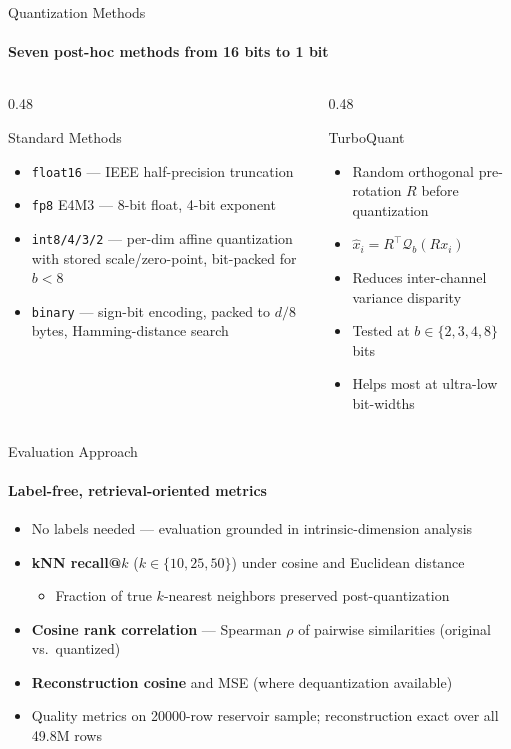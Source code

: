 \documentclass[aspectratio=169,10pt]{beamer}
\begin{document}
\begin{frame}{Quantization Methods}
	\framesubtitle{Seven post-hoc methods from 16 bits to 1 bit}
	\begin{columns}[T]
		\begin{column}{0.48\textwidth}
			\begin{block}{Standard Methods}
				\begin{itemize}
					\item \texttt{float16} --- IEEE half-precision truncation
					\item \texttt{fp8} E4M3 --- 8-bit float, 4-bit exponent
					\item \texttt{int8/4/3/2} --- per-dim affine quantization
					      with stored scale/zero-point, bit-packed for $b < 8$
					\item \texttt{binary} --- sign-bit encoding, packed to
					      $d/8$ bytes, Hamming-distance search
				\end{itemize}
			\end{block}
		\end{column}
		\begin{column}{0.48\textwidth}
			\begin{block}{TurboQuant}
				\begin{itemize}
					\item Random orthogonal pre-rotation $R$ before quantization
					\item $\hat{x}_i = R^\top \mathcal{Q}_b(R x_i)$
					\item Reduces inter-channel variance disparity
					\item Tested at $b \in \{2, 3, 4, 8\}$ bits
					\item Helps most at ultra-low bit-widths
				\end{itemize}
			\end{block}
		\end{column}
	\end{columns}
\end{frame}

\begin{frame}{Evaluation Approach}
	\framesubtitle{Label-free, retrieval-oriented metrics}
	\begin{itemize}
		\item No labels needed --- evaluation grounded in intrinsic-dimension analysis
		\item \textbf{kNN recall@$k$} ($k \in \{10, 25, 50\}$) under cosine and
		      Euclidean distance
		      \begin{itemize}
			      \item Fraction of true $k$-nearest neighbors preserved post-quantization
		      \end{itemize}
		\item \textbf{Cosine rank correlation} --- Spearman $\rho$ of pairwise
		      similarities (original vs.\ quantized)
		\item \textbf{Reconstruction cosine} and MSE (where dequantization available)
		\item Quality metrics on \num{20000}-row reservoir sample;
		      reconstruction exact over all 49.8M rows
	\end{itemize}
\end{frame}
\end{document}
